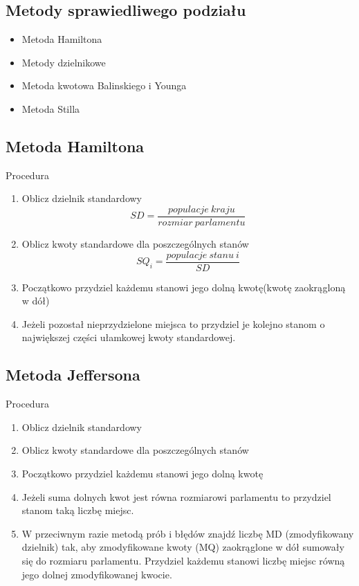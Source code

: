\documentclass[12pt,a4paper]{article}
\begin{document}
\subsection{Metody sprawiedliwego podziału}
\begin{itemize}
\item Metoda Hamiltona
\item Metody dzielnikowe
\item Metoda kwotowa Balinskiego i Younga
\item Metoda Stilla
\end{itemize}
\subsection{Metoda Hamiltona}
Procedura
\begin{enumerate}
\item Oblicz dzielnik standardowy
\begin{equation}
SD=\frac{populacje\ kraju}{rozmiar\ parlamentu}
\end{equation}
\item Oblicz kwoty standardowe dla poszczególnych stanów 
\begin{equation}
SQ_i	=\frac{populacje\ stanu \ i}{SD}
\end{equation}
\item Początkowo przydziel każdemu stanowi jego dolną kwotę(kwotę zaokrągloną w dół)
\item Jeżeli pozostał nieprzydzielone miejsca to przydziel je kolejno
stanom o największej części ułamkowej kwoty standardowej.
\end{enumerate}
\subsection{Metoda Jeffersona}
Procedura
\begin{enumerate}
\item Oblicz dzielnik standardowy 
\item Oblicz kwoty standardowe dla poszczególnych stanów 

\item Początkowo przydziel każdemu stanowi jego dolną kwotę
\item  Jeżeli suma dolnych kwot jest równa
rozmiarowi parlamentu to przydziel
stanom taką liczbę miejsc.
\item W przeciwnym razie metodą prób i błędów znajdź liczbę MD
(zmodyfikowany dzielnik) tak, aby zmodyfikowane kwoty
(MQ) zaokrąglone w dół sumowały się do rozmiaru parlamentu.
Przydziel każdemu stanowi liczbę miejsc równą jego dolnej
zmodyfikowanej kwocie.
\end{enumerate}
\end{document}
